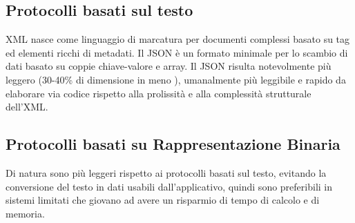 \subsection{Protocolli basati sul testo}

XML nasce come linguaggio di marcatura per documenti complessi basato su tag ed elementi ricchi di metadati.
Il JSON è un formato minimale per lo scambio di dati basato su coppie chiave-valore e array.
Il JSON risulta notevolmente più leggero (30-40\% di dimensione in meno \cite{cbor_comp} ), umanalmente più leggibile e rapido da elaborare via codice rispetto alla prolissità e alla complessità strutturale dell'XML.

\subsection{Protocolli basati su Rappresentazione Binaria}
Di natura sono più leggeri rispetto ai protocolli basati sul testo, evitando la conversione del testo in dati usabili dall'applicativo, quindi sono preferibili in sistemi limitati che giovano ad avere un risparmio di tempo di calcolo e di memoria.
